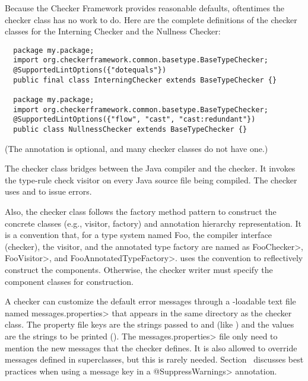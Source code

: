 Because the Checker Framework provides reasonable defaults, oftentimes the
checker class has no work to do.  Here are the complete definitions of the
checker classes for the Interning Checker and the Nullness Checker:

\begin{Verbatim}
  package my.package;
  import org.checkerframework.common.basetype.BaseTypeChecker;
  @SupportedLintOptions({"dotequals"})
  public final class InterningChecker extends BaseTypeChecker {}

  package my.package;
  import org.checkerframework.common.basetype.BaseTypeChecker;
  @SupportedLintOptions({"flow", "cast", "cast:redundant"})
  public class NullnessChecker extends BaseTypeChecker {}
\end{Verbatim}

(The  annotation is
optional, and many checker classes do not have one.)

The checker class bridges between the Java compiler and the checker.  It
invokes the type-rule check visitor on every Java source file being
compiled.  The checker uses
and
to issue errors.

Also, the checker class follows the factory method pattern to
construct the concrete classes (e.g., visitor, factory) and annotation
hierarchy representation.  It is a convention that, for
a type system named Foo, the compiler
interface (checker), the visitor, and the annotated type factory are
named as \<FooChecker>, \<FooVisitor>, and \<FooAnnotatedTypeFactory>.
 uses the convention to
reflectively construct the components.  Otherwise, the checker writer
must specify the component classes for construction.

\begin{sloppypar}
A checker can customize the default error messages through a
-loadable text file named
\<messages.properties> that appears in the same directory as the checker class.
The property file keys are the strings passed to 
and
(like ) and the values are the strings to be
printed ().
The \<messages.properties> file only need to mention the new messages that
the checker defines.
It is also allowed to override messages defined in superclasses, but this
is rarely needed.
Section~ discusses best practices
when using a message key in a \<@SuppressWarnings> annotation.
\end{sloppypar}

